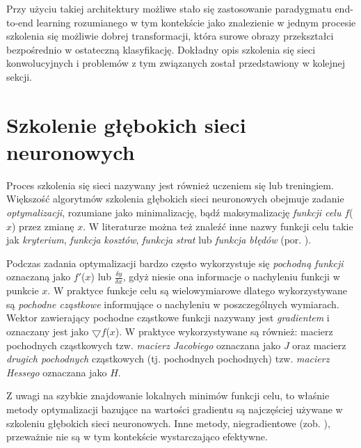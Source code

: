Przy użyciu takiej architektury możliwe stało się zastosowanie paradygmatu end-to-end learning rozumianego w tym kontekście jako znalezienie w jednym procesie szkolenia się możliwie dobrej transformacji, która surowe obrazy przekształci bezpośrednio w ostateczną klasyfikację. Dokładny opis szkolenia się sieci konwolucyjnych i problemów z tym związanych został przedstawiony w kolejnej sekcji.  

\section{Szkolenie głębokich sieci neuronowych}

Proces szkolenia się sieci nazywany jest również uczeniem się lub treningiem. Większość algorytmów szkolenia głębokich sieci neuronowych obejmuje zadanie \textit{optymalizacji}, rozumiane jako minimalizację, bądź maksymalizację \textit{funkcji celu} $f$($x$) przez zmianę $x$. W literaturze można też znaleźć inne nazwy funkcji celu takie jak \textit{kryterium}, \textit{funkcja kosztów}, \textit{funkcja strat} lub \textit{funkcja błędów} (por. \cite{Goodfellow-et-al-2016}). 

Podczas zadania optymalizacji bardzo często wykorzystuje się \textit{pochodną funkcji} oznaczaną jako $f'$($x$) lub $\frac{\delta y}{\delta x}$, gdyż niesie ona informacje o nachyleniu funkcji w punkcie $x$. W praktyce funkcje celu są wielowymiarowe dlatego wykorzystywane są \textit{pochodne cząstkowe} informujące o nachyleniu w poszczególnych wymiarach. Wektor zawierający pochodne cząstkowe funkcji nazywany jest \textit{gradientem} i oznaczany jest jako $\bigtriangledown f$($x$). W praktyce wykorzystywane są również: macierz pochodnych cząstkowych tzw. \textit{macierz Jacobiego} oznaczana jako $J$ oraz macierz \textit{drugich pochodnych} cząstkowych (tj. pochodnych pochodnych) tzw. \textit{macierz Hessego} oznaczana jako $H$.

Z uwagi na szybkie znajdowanie lokalnych minimów funkcji celu, to właśnie metody optymalizacji bazujące na wartości gradientu są najczęściej używane w szkoleniu głębokich sieci neuronowych. Inne metody, niegradientowe (zob. \cite{DBLP:journals/corr/TaylorBXSPG16}), przeważnie nie są w tym kontekście wystarczająco efektywne. 

